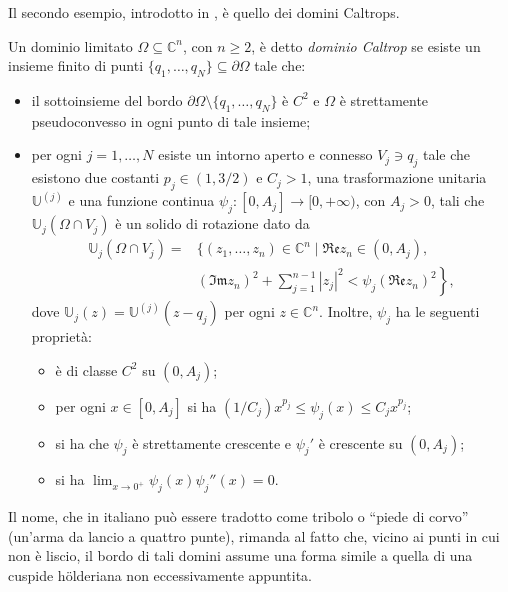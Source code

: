 Il secondo esempio, introdotto in \cite{BM}, è quello dei domini Caltrops.

\begin{defn} \label{defcaltrop}
    Un dominio limitato $\Omega\subseteq\mathbb{C}^n$, con $n\ge 2$, è detto \textit{dominio Caltrop} se esiste un insieme finito di punti $\{q_1,\dots,q_N\}\subseteq\partial\Omega$ tale che:
    \begin{itemize}
        \item il sottoinsieme del bordo $\partial\Omega\setminus\{q_1,\dots,q_N\}$ è $C^2$ e $\Omega$ è strettamente pseudoconvesso in ogni punto di tale insieme;
        \item per ogni $j=1,\dots, N$ esiste un intorno aperto e connesso $V_j\ni q_j$ tale che esistono due costanti $p_j\in(1,3/2)$ e $C_j>1$, una trasformazione unitaria $\mathbb{U}^{(j)}$ e una funzione continua $\psi_j:[0,A_j]\longrightarrow[0,+\infty)$, con $A_j>0$, tali che $\mathbb{U}_j(\Omega\cap V_j)$ è un solido di rotazione dato da
        \begin{align*}
            \mathbb{U}_j(\Omega\cap V_j)=&\Bigg\{(z_1,\dots,z_n)\in\mathbb{C}^n\mid \mathfrak{Re}z_n\in (0,A_j),\\
            &\left.(\mathfrak{Im}z_n)^2+\sum_{j=1}^{n-1}|z_j|^2<\psi_j(\mathfrak{Re}z_n)^2\right\},
        \end{align*}
        dove $\mathbb{U}_j(z)=\mathbb{U}^{(j)}(z-q_j)$ per ogni $z\in\mathbb{C}^n$. Inoltre, $\psi_j$ ha le seguenti proprietà:
        \begin{itemize}
            \item è di classe $C^2$ su $(0,A_j)$;
            \item per ogni $x\in[0,A_j]$ si ha $(1/C_j)x^{p_j} \le \psi_j(x) \le C_jx^{p_j}$;
            \item si ha che $\psi_j$ è strettamente crescente e $\psi_j'$ è crescente su $(0,A_j)$;
            \item si ha $\displaystyle\lim_{x\longrightarrow0^+}\psi_j(x)\psi_j''(x)=0$.
        \end{itemize}
    \end{itemize}
\end{defn}

\begin{oss}
    Il nome, che in italiano può essere tradotto come tribolo o ``piede di corvo'' (un'arma da lancio a quattro punte), rimanda al fatto che, vicino ai punti in cui non è liscio, il bordo di tali domini assume una forma simile a quella di una cuspide hölderiana non eccessivamente appuntita.
\end{oss}


